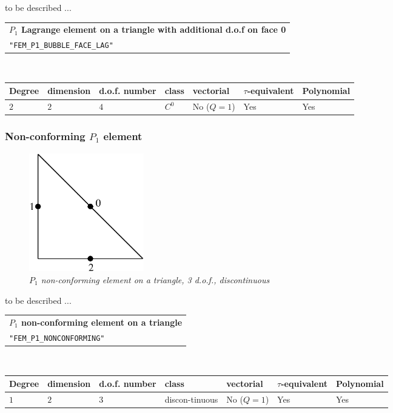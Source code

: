 \documentclass[11pt,a4paper]{article}
\begin{document}
to be described ...

\begin{center}
\begin{tabular}{|m{16.11cm}|} \hline 
{ \bf $P_1$ Lagrange element on a triangle with additional d.o.f on face 0}\\
{\tt "FEM\_P1\_BUBBLE\_FACE\_LAG"} 
\end{tabular} \\ \vspace{-1pt} 
\begin{tabular}{|m{2cm}|m{2cm}|m{2.5cm}|m{1.2cm}|m{2cm}|m{2cm}|m{1.8cm}|} \hline 
Degree & dimension & d.o.f. number & class & vectorial & \mbox{$\tau$-equivalent} & Polynomial\\ \hline
$2$ & $2$ & $4$ & $C^0$ & No \mbox{($Q = 1$)} & Yes & Yes\\ \hline
\end{tabular}
\end{center}

\subsubsection{Non-conforming $P_1$ element}


\begin{figure}[H]
  \begin{center}
    \includegraphics[width=5cm,angle=0]{getfemlist_triangle_P1_non_conforming.eps}
  \end{center}
  \caption{ \it $P_1$ non-conforming element on a triangle, 3 d.o.f., discontinuous} 
  \label{fig:triangle_non_conforming}
\end{figure}

to be described ...
\begin{center}
\begin{tabular}{|m{16.11cm}|} \hline 
{ \bf $P_1$ non-conforming element on a triangle}\\
{\tt "FEM\_P1\_NONCONFORMING"} 
\end{tabular} \\ \vspace{-1pt} 
\begin{tabular}{|m{2cm}|m{2cm}|m{2.5cm}|m{1.2cm}|m{2cm}|m{2cm}|m{1.8cm}|} \hline 
Degree & dimension & d.o.f. number & class & vectorial & \mbox{$\tau$-equivalent} & Polynomial\\ \hline
$1$ & $2$ & $3$ & discon-tinuous & No \mbox{($Q = 1$)} & Yes & Yes\\ \hline
\end{tabular}
\end{center}
\end{document}
